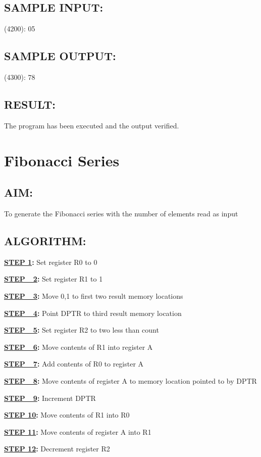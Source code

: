 \documentclass[a4paper,28pt]{report}
\begin{document}
\section*{SAMPLE INPUT:}
(4200): 05

\section*{SAMPLE OUTPUT:}
(4300): 78
\section*{RESULT:}

The program has been executed and the output verified.
%
%
%
%
\chapter{Fibonacci Series}
\section*{AIM:}
To generate the Fibonacci series with the number of elements read as input
\section*{ALGORITHM:}
\textbf{\underline{STEP 1}:} Set register R0 to 0

\textbf{\underline{STEP\ \ 2}:} Set register R1 to 1

\textbf{\underline{STEP\ \ 3}:} Move 0,1 to first two result memory locations

\textbf{\underline{STEP\ \ 4}:} Point DPTR to third result memory location

\textbf{\underline{STEP\ \ 5}:} Set register R2 to two less than count

\textbf{\underline{STEP\ \ 6}:} Move contents of R1 into register A

\textbf{\underline{STEP\ \ 7}:} Add contents of R0 to register A

\textbf{\underline{STEP\ \ 8}:} Move contents of register A to memory location pointed to by DPTR

\textbf{\underline{STEP\ \ 9}:} Increment DPTR

\textbf{\underline{STEP 10}:} Move contents of R1 into R0

\textbf{\underline{STEP 11}:} Move contents of register A into R1

\textbf{\underline{STEP 12}:} Decrement register R2
\end{document}
